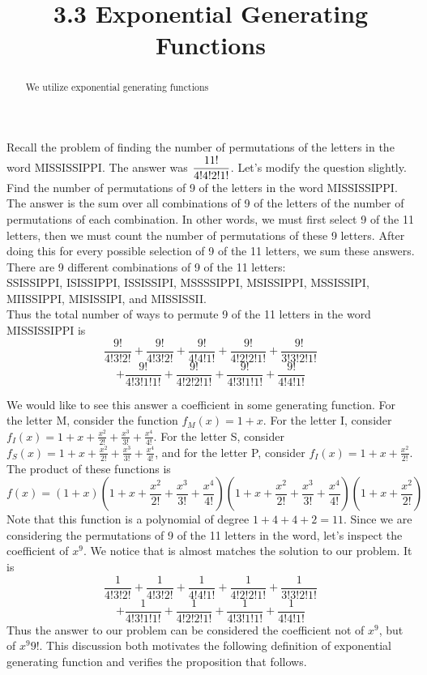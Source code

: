 \documentclass[handout]{ximera}
\title{3.3 Exponential Generating Functions}
\begin{document}
\begin{abstract}
We utilize exponential generating functions
\end{abstract}

\maketitle

Recall the problem of finding the number of permutations of the letters in the word MISSISSIPPI. The answer was $\displaystyle \frac{11!}{4!4!2!1!}$.
Let's modify the question slightly.  Find the number of permutations of 9 of the letters in the word MISSISSIPPI. 
The answer is the sum over all combinations of 9 of the letters of the number of permutations of each combination. 
In other words, we must first select 9 of the 11 letters, then we must count the number of permutations of these 9 letters.  
After doing this for every possible selection of 9 of the 11 letters, we sum these answers.
There are 9 different combinations of 9 of the 11 letters:\\
SSISSIPPI, ISISSIPPI, ISSISSIPI, MSSSSIPPI, MSISSIPPI, MSSISSIPI, MIISSIPPI, MISISSIPI, and MISSISSII.\\
Thus the total number of ways to permute 9 of the 11 letters in the word MISSISSIPPI is
\[
\frac{9!}{4!3!2!} + \frac{9!}{4!3!2!} + \frac{9!}{4!4!1!} + \frac{9!}{4!2!2!1!} + \frac{9!}{3!3!2!1!} 
\]
\[
+ \frac{9!}{4!3!1!1!} + \frac{9!}{4!2!2!1!} + \frac{9!}{4!3!1!1!} + \frac{9!}{4!4!1!}
\]
 
We would like to see this answer a coefficient in some generating function.
For the letter M, consider the function $f_M(x) = 1+x$. For the letter I, 
consider $f_I(x) = 1 + x + \frac{x^2}{2!} + \frac{x^3}{3!} + \frac{x^4}{4!}$.
For the letter S, consider $f_S(x) = 1 + x + \frac{x^2}{2!} + \frac{x^3}{3!} + \frac{x^4}{4!}$,
and for the letter P, consider $f_I(x) = 1 + x + \frac{x^2}{2!}$.
The product of these functions is
\[
f(x) = \left(1+x\right)\left(1+x+\frac{x^2}{2!} + \frac{x^3}{3!} + \frac{x^4}{4!}\right)
\left(1+x+\frac{x^2}{2!} + \frac{x^3}{3!} + \frac{x^4}{4!}\right)
\left(1+x+\frac{x^2}{2!}\right)
\]
Note that this function is a polynomial of degree $1+4+4+2 = 11$. 
Since we are considering the permutations of 9 of the 11 letters in the word, let's inspect the coefficient of $x^9$.
We notice that is almost matches the solution to our problem. It is
\[
\frac{1}{4!3!2!} + \frac{1}{4!3!2!} + \frac{1}{4!4!1!} + \frac{1}{4!2!2!1!} + \frac{1}{3!3!2!1!} 
\]
\[
+ \frac{1}{4!3!1!1!} + \frac{1}{4!2!2!1!} + \frac{1}{4!3!1!1!} + \frac{1}{4!4!1!}
\]
Thus the answer to our problem can be considered the coefficient not of $x^9$, but of ${x^9}{9!}$. 
This discussion both motivates the following definition of exponential
generating function and verifies the proposition that follows.
\end{document}
